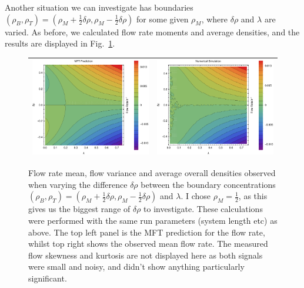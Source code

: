 Another situation we can investigate has boundaries $(\rho_B, \rho_T) = (\rho_M + \frac{1}{2} \delta\rho, \rho_M - \frac{1}{2} \delta\rho)$ for some given $\rho_M$, where $\delta\rho$ and $\lambda$ are varied. As before, we calculated flow rate
moments and average densities, and the results are displayed in Fig.~\ref{fig:constDens}. 
\iffalse
\begin{figure}[h!]
\vspace{1em}
\caption{\label{fig:constDens} Flow rate mean, flow variance and average overall densities observed when varying the difference $\delta\rho$ between the boundary concentrations
$(\rho_B, \rho_T) = (\rho_M + \frac{1}{2} \delta\rho, \rho_M - \frac{1}{2} \delta\rho)$ and $\lambda$. I chose $\rho_M=\frac{1}{2}$, as this gives us the biggest range of $\delta\rho$ to investigate.
These calculations were performed with the same run parameters (system length etc)
as above. The top left panel is the MFT prediction
for the flow rate, whilst top right shows the observed mean flow rate. The measured flow skewness and kurtosis are not displayed here as both signals were small and noisy, and didn't show anything particularly significant.}
\begin{center}
 \begin{tabular}{c|c}
    \includegraphics[width=0.5\linewidth]{../tex-src/images/constDens/newMftPred} & \includegraphics[width=0.5\linewidth]{../tex-src/images/constDens/newFlow} \\
    \hline

\end{tabular}
\end{center}
\end{figure}
